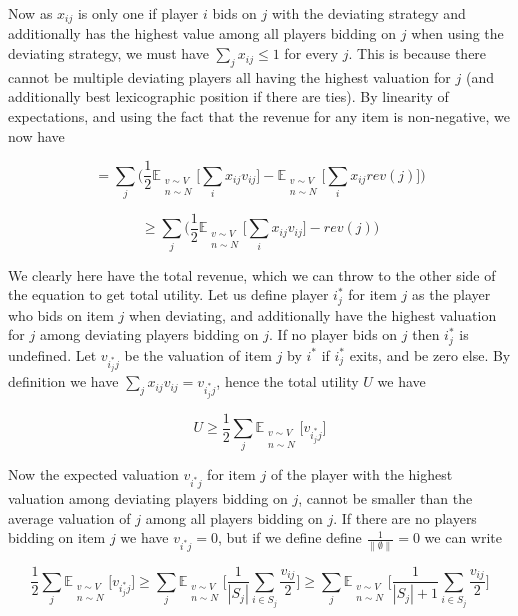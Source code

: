 Now as $x_{ij}$ is only one if player $i$ bids on $j$ with the deviating strategy and additionally has the highest value among all players bidding on $j$ when using the deviating strategy, we must have $\sum_{j} x_{ij} \le 1$ for every $j$. This is because there cannot be multiple deviating players all having the highest valuation for $j$ (and additionally best lexicographic position if there are ties). By linearity of expectations, and using the fact that the revenue for any item is non-negative, we now have

$$
=  \sum_j  \bigg( \frac{1}{2} \mathbb{E}_{ \substack{ v \sim V \\ n \sim N }} \bigg[ \sum_i  x_{ij} v_{ij} \bigg]  - \mathbb{E}_{ \substack{ v \sim V \\ n \sim N }} \bigg[ \sum_i x_{ij}  rev(j)  \bigg] \bigg)
$$


$$
\ge \sum_j  \bigg(  \frac{1}{2} \mathbb{E}_{ \substack{ v \sim V \\ n \sim N }} \bigg[ \sum_i  x_{ij} v_{ij} \bigg]  -   rev(j)  \bigg)
$$

We clearly here have the total revenue, which we can throw to the other side of the equation to get total utility. Let us define player $i^*_j$ for item $j$ as the player who bids on item $j$ when deviating, and additionally have the highest valuation for $j$ among deviating players bidding on $j$. If no player bids on $j$ then $i^*_j$ is undefined.  Let $v_{i^*_j j}$ be the valuation of item $j$ by $i^*$ if $i^*_j$ exits, and be zero else. By definition we have $\sum_j x_{ij} v_{ij} = v_{i^*_j j}$, hence the total utility $U$ we have

$$
U \ge  \frac{1}{2} \sum_j \mathbb{E}_{ \substack{ v \sim V \\ n \sim N }} \big[ v_{i^*_j j}  \big]
$$

Now the expected valuation $v_{i^*j}$ for item $j$ of the player with the highest valuation among deviating players bidding on $j$, cannot be smaller than the average valuation of $j$ among all players bidding on $j$. If there are no players bidding on item $j$ we have $v_{i^*j}=0$, but if we define define $\frac{1}{\| \emptyset\|} = 0$ we can write

$$
\frac{1}{2} \sum_j \mathbb{E}_{ \substack{ v \sim V \\ n \sim N }} \big[ v_{i^*_j j}  \big]  \ge \sum_j \mathbb{E}_{ \substack{ v \sim V \\ n \sim N }} \bigg[ \frac{1}{|S_j|}   \sum_{i \in S_j} \frac{v_{ij}}{2} \bigg] \ge \sum_j \mathbb{E}_{ \substack{ v \sim V \\ n \sim N }} \bigg[ \frac{1}{|S_j|+1}    \sum_{i \in S_j} \frac{v_{ij}}{2} \bigg] 
$$

